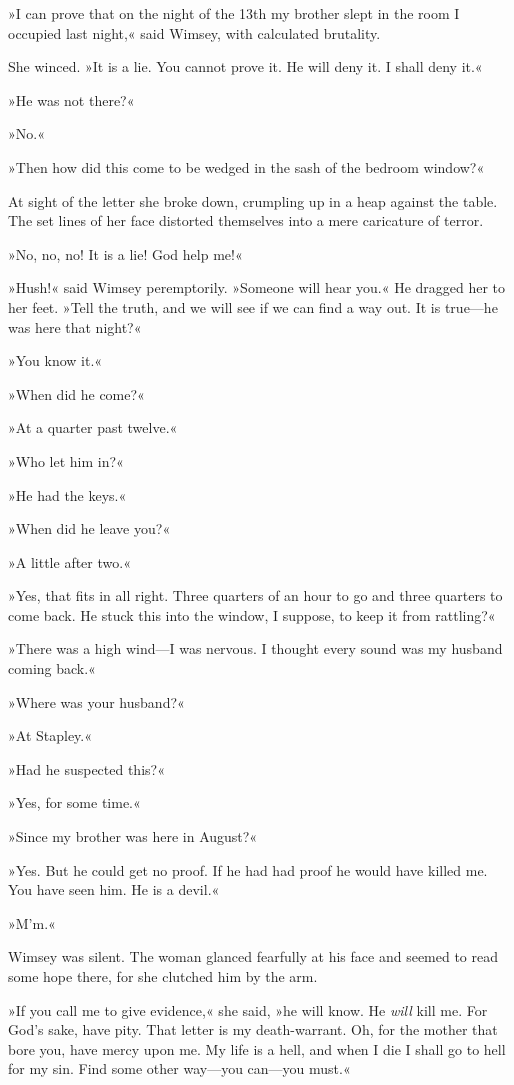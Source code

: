 »I can prove that on the night of the 13th my brother slept in the room I occupied last night,« said Wimsey, with calculated brutality.

She winced. »It is a lie. You cannot prove it. He will deny it. I shall deny it.«

»He was not there?«

»No.«

»Then how did this come to be wedged in the sash of the bedroom window?«

At sight of the letter she broke down, crumpling up in a heap against the table. The set lines of her face distorted themselves into a mere caricature of terror.

»No, no, no! It is a lie! God help me!«

»Hush!« said Wimsey peremptorily. »Someone will hear you.« He dragged her to her feet. »Tell the truth, and we will see if we can find a way out. It is true—he was here that night?«

»You know it.«

»When did he come?«

»At a quarter past twelve.«

»Who let him in?«

»He had the keys.«

»When did he leave you?«

»A little after two.«

»Yes, that fits in all right. Three quarters of an hour to go and three quarters to come back. He stuck this into the window, I suppose, to keep it from rattling?«

»There was a high wind—I was nervous. I thought every sound was my husband coming back.«

»Where was your husband?«

»At Stapley.«

»Had he suspected this?«

»Yes, for some time.«

»Since my brother was here in August?«

»Yes. But he could get no proof. If he had had proof he would have killed me. You have seen him. He is a devil.«

»M'm.«

Wimsey was silent. The woman glanced fearfully at his face and seemed to read some hope there, for she clutched him by the arm.

»If you call me to give evidence,« she said, »he will know. He \textit{will} kill me. For God's sake, have pity. That letter is my death-warrant.  Oh, for the mother that bore you, have mercy upon me. My life is a hell, and when I die I shall go to hell for my sin. Find some other way—you can—you must.«

